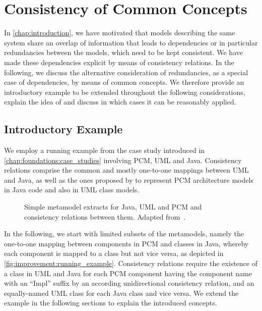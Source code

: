 \section{Consistency of Common Concepts}
\label{chap:improvement:concpets}

In \autoref{chap:introduction}, we have motivated that models describing the same system share an overlap of information that leads to dependencies or in particular redundancies between the models, which need to be kept consistent.
We have made these dependencies explicit by means of consistency relations.
In the following, we discuss the alternative consideration of redundancies, as a special case of dependencies, by means of common concepts.
We therefore provide an introductory example to be extended throughout the following considerations, explain the idea of \emph{\commonalities} and discuss in which cases it can be reasonably applied.


\subsection{Introductory Example}

We employ a running example from the case study introduced in \autoref{chap:foundations:case_studies} involving \gls{PCM}, \gls{UML} and Java.
Consistency relations comprise the common and mostly one-to-one mappings between \gls{UML} and Java, as well as the ones proposed by \textcite{langhammer2015a} to represent \gls{PCM} architecture models in Java code and also in \gls{UML} class models.

\begin{figure}
	\centering
	
	\caption[Consistency relations for extracts of Java, \acrshort{UML} and \acrshort{PCM}]{Simple metamodel extracts for Java, \gls{UML} and \gls{PCM} and consistency relations between them. Adapted from~.}
	\label{fig:improvement:running_example}
\end{figure}

In the following, we start with limited subsets of the metamodels, namely the one-to-one mapping between components in \gls{PCM} and classes in Java, whereby each component is mapped to a class but not vice versa, as depicted in \autoref{fig:improvement:running_example}.
Consistency relations require the existence of a class in \gls{UML} and Java for each \gls{PCM} component having the component name with an \enquote{Impl} suffix by an according unidirectional consistency relation, and an equally-named \gls{UML} class for each Java class and vice versa.
We extend the example in the following sections to explain the introduced concepts.


